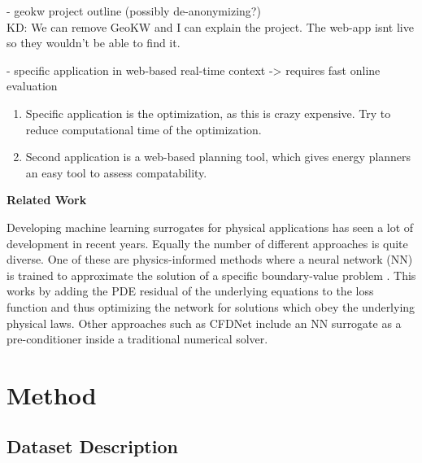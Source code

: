 \documentclass{article} %
\begin{document}
- geokw project outline (possibly de-anonymizing?) \\
KD: We can remove GeoKW and I can explain the project. The web-app isnt live so they wouldn't be able to find it.

- specific application in web-based real-time context -> requires fast online evaluation
\begin{enumerate}
\item Specific application is the optimization, as this is crazy expensive. Try to reduce computational time of the optimization.
\item Second application is a web-based planning tool, which gives energy planners an easy tool to assess compatability.
\end{enumerate}

\textbf{Related Work}

Developing machine learning surrogates for physical applications has seen a lot of development in recent years.
Equally the number of different approaches is quite diverse.
One of these are physics-informed methods where a neural network (NN) is trained to approximate the solution of a specific boundary-value problem \cite{pinn}.
This works by adding the PDE residual of the underlying equations to the loss function and thus optimizing the network for solutions which obey the underlying physical laws.
Other approaches such as CFDNet \cite{cfdnet} include an NN surrogate as a pre-conditioner inside a traditional numerical solver.

\section{Method}
\label{sec:method}

\subsection*{Dataset Description}





\end{document}
